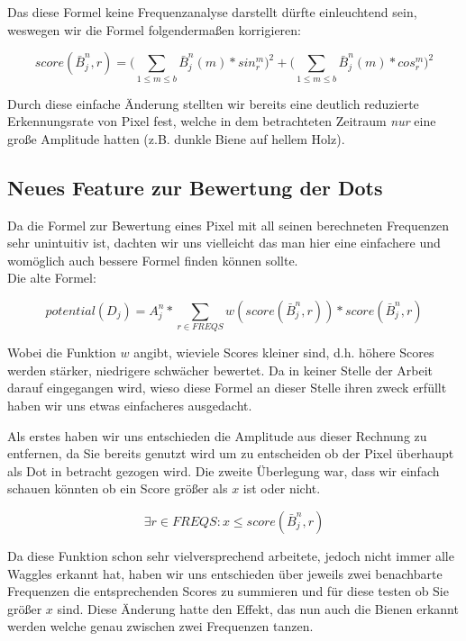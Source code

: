 \documentclass[11pt,a4paper]{article}
\begin{document}
Das diese Formel keine Frequenzanalyse darstellt dürfte einleuchtend sein, weswegen wir die Formel folgendermaßen korrigieren:
\begin{center}
\begin{equation} 
score(\bar{B}_j^n, r) = \big(\sum_{1\le m\le b} \bar{B}_j^n(m) * sin_r^m\big)^2 +  \big(\sum_{1\le m\le b} \bar{B}_j^n(m) * cos_r^m\big)^2
\end{equation}
\end{center}

Durch diese einfache Änderung stellten wir bereits eine deutlich reduzierte Erkennungsrate von Pixel fest, welche in dem betrachteten Zeitraum \emph{nur} eine große Amplitude hatten (z.B. dunkle Biene auf hellem Holz).

\subsection{Neues Feature zur Bewertung der Dots}%
Da die Formel zur Bewertung eines Pixel mit all seinen berechneten Frequenzen sehr unintuitiv ist, dachten wir uns vielleicht das man hier eine einfachere und womöglich auch bessere Formel finden können sollte.\\
Die alte Formel:
\begin{center}
\begin{equation} 
potential(D_j)=A^n_j*\sum_{r\in FREQS}w(score(\bar{B}_j^n, r)) * score(\bar{B}_j^n,r)
\end{equation}
\end{center}

Wobei die Funktion $w$ angibt, wieviele Scores kleiner sind, d.h. höhere Scores werden stärker, niedrigere schwächer bewertet. Da in keiner Stelle der Arbeit darauf eingegangen wird, wieso diese Formel an dieser Stelle ihren zweck erfüllt haben wir uns etwas einfacheres ausgedacht.

Als erstes haben wir uns entschieden die Amplitude aus dieser Rechnung zu entfernen, da Sie bereits genutzt wird um zu entscheiden ob der Pixel überhaupt als Dot in betracht gezogen wird. Die zweite Überlegung war, dass wir einfach schauen könnten ob ein Score größer als $x$ ist oder nicht.

\begin{center}
\begin{equation} 
\exists r\in FREQS : x\le score(\bar{B}_j^n, r)
\end{equation}
\end{center}

Da diese Funktion schon sehr vielversprechend arbeitete, jedoch nicht immer alle Waggles erkannt hat, haben wir uns entschieden über jeweils zwei benachbarte Frequenzen die entsprechenden Scores zu summieren und für diese testen ob Sie größer $x$ sind. Diese Änderung hatte den Effekt, das nun auch die Bienen erkannt werden welche genau zwischen zwei Frequenzen tanzen.
\end{document}
